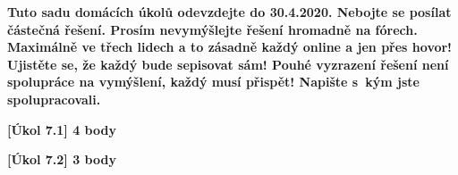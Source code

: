 \textbf{
	Tuto sadu domácích úkolů odevzdejte do 30.4.2020.
	Nebojte se posílat částečná řešení.
	Prosím nevymýšlejte řešení hromadně na fórech.
	Maximálně ve třech lidech a to zásadně každý online a jen přes hovor!
	Ujistěte se, že každý bude sepisovat sám!
	Pouhé vyzrazení řešení není spolupráce na vymýšlení, každý musí přispět!
	Napište s~kým jste spolupracovali.
}

\textbf{[Úkol 7.1] 4 body}

\textbf{[Úkol 7.2] 3 body}


